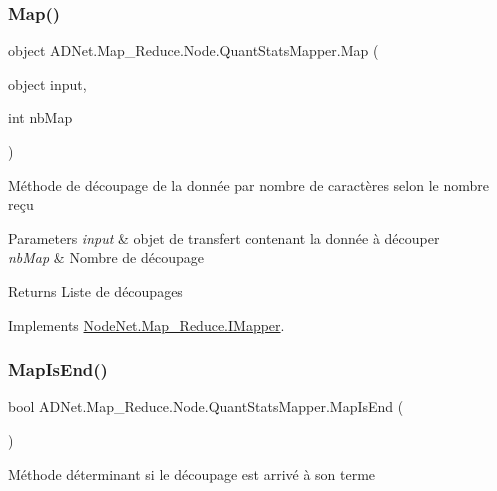 \subsubsection{\texorpdfstring{Map()}{Map()}}
{\footnotesize\ttfamily object A\+D\+Net.\+Map\+\_\+\+Reduce.\+Node.\+Quant\+Stats\+Mapper.\+Map (\begin{DoxyParamCaption}\item[{object}]{input,  }\item[{int}]{nb\+Map }\end{DoxyParamCaption})}



Méthode de découpage de la donnée par nombre de caractères selon le nombre reçu 


\begin{DoxyParams}{Parameters}
{\em input} & objet de transfert contenant la donnée à découper\\
\hline
{\em nb\+Map} & Nombre de découpage\\
\hline
\end{DoxyParams}
\begin{DoxyReturn}{Returns}
Liste de découpages
\end{DoxyReturn}


Implements \hyperlink{interface_node_net_1_1_map___reduce_1_1_i_mapper_ac25758a2753bdfdc9579d29b9a31fe73}{Node\+Net.\+Map\+\_\+\+Reduce.\+I\+Mapper}.

\mbox{\label{class_a_d_net_1_1_map___reduce_1_1_node_1_1_quant_stats_mapper_aca541c507e21824ff679f62be55aeab4}} 
\subsubsection{\texorpdfstring{Map\+Is\+End()}{MapIsEnd()}}
{\footnotesize\ttfamily bool A\+D\+Net.\+Map\+\_\+\+Reduce.\+Node.\+Quant\+Stats\+Mapper.\+Map\+Is\+End (\begin{DoxyParamCaption}{ }\end{DoxyParamCaption})}



Méthode déterminant si le découpage est arrivé à son terme 

